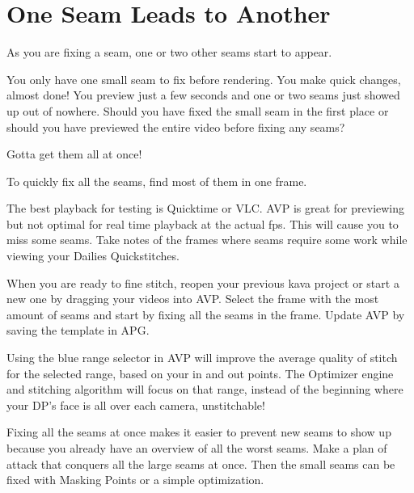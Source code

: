 \chapter{One Seam Leads to Another}
\pagecolor{white}
\label{chap:38}
\begin{fullwidth}

\problem

{\large As you are fixing a seam, one or two other seams start to appear. \par}

You only have one small seam to fix before rendering. You make quick changes, almost done! You preview just a few seconds and one or two seams just showed up out of nowhere. Should you have fixed the small seam in the first place or should you have previewed the entire video before fixing any seams?

\solutions

{\large Gotta get them all at once! \par}

To quickly fix all the seams, find most of them in one frame. 


The best playback for testing is Quicktime or VLC. AVP is great for previewing but not optimal for real time playback at the actual fps. This will cause you to miss some seams. Take notes of the frames where seams require some work while viewing your Dailies Quickstitches.


When you are ready to fine stitch, reopen your previous kava project or start a new one by dragging your videos into AVP. Select the frame with the most amount of seams and start by fixing all the seams in the frame. Update AVP by saving the template in APG.

Using the blue range selector in AVP will improve the average quality of stitch for the selected range, based on your in and out points. The Optimizer engine and stitching algorithm will focus on that range, instead of the beginning where your DP’s face is all over each camera, unstitchable!


Fixing all the seams at once makes it easier to prevent new seams to show up because you already have an overview of all the worst seams. Make a plan of attack that conquers all the large seams at once. Then the small seams can be fixed with Masking Points or a simple optimization.


\end{fullwidth}
